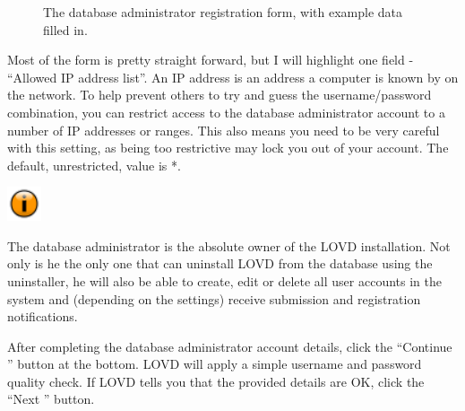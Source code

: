 \documentclass[a4paper,oneside,openany,12pt]{memoir}
\newlength{\infoboxlength}
\newlength{\infoboxinnerlength}
\newenvironment{infotable}
  {\begin{lrbox}{\infobox}%
    \begin{minipage}[t]{1.5cm}
      \centering
      \vspace{0pt}
      \includegraphics[width=1cm,height=1cm]{lovd_information.png}
    \end{minipage}
   \begin{minipage}[t]{\infoboxlength}\vspace{5pt}\begin{minipage}{\infoboxinnerlength}}
  {\vspace{6pt}\end{minipage}\end{minipage}\end{lrbox}%
   \begin{center}
   \fcolorbox{black}{LOVDlight}{\usebox{\infobox}}
   \end{center}}
\begin{document}
\begin{figure}[h]
  \begin{shaded}
  \caption{The database administrator registration form, with example data filled in.}
  \end{shaded}
\end{figure}

Most of the form is pretty straight forward, but I will highlight one field - ``Allowed IP address list''.
An IP address is an address a computer is known by on the network.
To help prevent others to try and guess the username/password combination,
you can restrict access to the database administrator account to a number of IP addresses or ranges.
This also means you need to be very careful with this setting, as being too restrictive may lock you out of your account.
The default, unrestricted, value is *.

\begin{infotable}
The database administrator is the absolute owner of the LOVD installation.
Not only is he the only one that can uninstall LOVD from the database using the uninstaller,
he will also be able to create, edit or delete all user accounts in the system and
(depending on the settings) receive submission and registration notifications.
\end{infotable}

After completing the database administrator account details, click the ``Continue \guillemotright'' button at the bottom.
LOVD will apply a simple username and password quality check.
If LOVD tells you that the provided details are OK, click the ``Next \guillemotright'' button.
\end{document}
